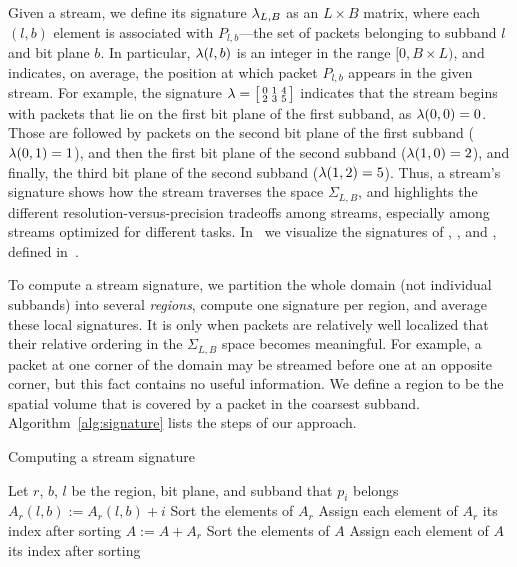 Given a stream, we define its signature $\sgn_{L,B}$ as an $L \times B$ matrix, where each $(l,b)$
element is associated with $P_{l,b}$---the set of packets belonging to subband $l$ and bit plane
$b$. In particular, $\sgn(l,b)$ is an integer in the range $[0, B\times L)$, and indicates, on
average, the position at which packet $P_{l,b}$ appears in the given stream. For example, the
signature $\sgn=\bigl[ \begin{smallmatrix}0 & 1 & 4\\ 2 & 3 & 5\end{smallmatrix}\bigr]$ indicates
that the stream begins with packets that lie on the first bit plane of the first subband, as
$\sgn(0,0)=0$. Those are followed by packets on the second bit plane of the first subband
($\sgn(0,1)=1$), and then the first bit plane of the second subband ($\sgn(1,0)=2$), and finally,
the third bit plane of the second subband ($\sgn(1,2)=5$). Thus, a stream's signature shows how the
stream traverses the space $\Sigma_{L,B}$, and highlights the different resolution-versus-precision
tradeoffs among streams, especially among \sopt streams optimized for different tasks.
In~ we visualize the signatures of \sbit, \slvl, and \swav, defined
in~.

To compute a stream signature, we partition the whole domain (not individual subbands) into several
\emph{regions}, compute one signature per region, and average these local signatures. It is only
when packets are relatively well localized that their relative ordering in the $\Sigma_{L,B}$ space
becomes meaningful. For example, a packet at one corner of the domain may be streamed before one at
an opposite corner, but this fact contains no useful information. We define a region to be the
spatial volume that is covered by a packet in the coarsest subband. Algorithm~\ref{alg:signature}
lists the steps of our approach.

\begin{algorithm}[h]
  \caption{Computing a stream signature}
  \begin{algorithmic}[1]
			\State Let $r$, $b$, $l$ be the region, bit plane, and subband that $p_i$ belongs
			\State $A_r(l,b) := A_r(l,b)+i$
		\EndFor
			\State Sort the elements of $A_r$
			\State Assign each element of $A_r$ its index after sorting
			\State $A := A+A_r$
		\EndFor
		\State Sort the elements of $A$
		\State Assign each element of $A$ its index after sorting
	\end{algorithmic}
	\label{alg:signature}
\end{algorithm}


